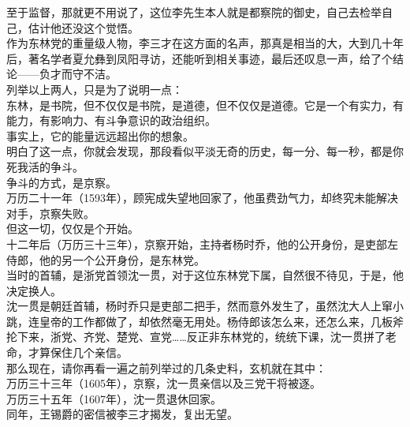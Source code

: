 \begin{multicols}{\theparacolNo}
至于监督，那就更不用说了，这位李先生本人就是都察院的御史，自己去检举自己，估计他还没这个觉悟。\\

作为东林党的重量级人物，李三才在这方面的名声，那真是相当的大，大到几十年后，著名学者夏允彝到凤阳寻访，还能听到相关事迹，最后还叹息一声，给了个结论——负才而守不洁。\\

列举以上两人，只是为了说明一点：\\

东林，是书院，但不仅仅是书院，是道德，但不仅仅是道德。它是一个有实力，有能力，有影响力、有斗争意识的政治组织。\\

事实上，它的能量远远超出你的想象。\\

明白了这一点，你就会发现，那段看似平淡无奇的历史，每一分、每一秒，都是你死我活的争斗。\\

争斗的方式，是京察。\\

万历二十一年（1593年），顾宪成失望地回家了，他虽费劲气力，却终究未能解决对手，京察失败。\\

但这一切，仅仅是个开始。\\

十二年后（万历三十三年），京察开始，主持者杨时乔，他的公开身份，是吏部左侍郎，他的另一个公开身份，是东林党。\\

当时的首辅，是浙党首领沈一贯，对于这位东林党下属，自然很不待见，于是，他决定换人。\\

沈一贯是朝廷首辅，杨时乔只是吏部二把手，然而意外发生了，虽然沈大人上窜小跳，连皇帝的工作都做了，却依然毫无用处。杨侍郎该怎么来，还怎么来，几板斧抡下来，浙党、齐党、楚党、宣党……反正非东林党的，统统下课，沈一贯拼了老命，才算保住几个亲信。\\

那么现在，请你再看一遍之前列举过的几条史料，玄机就在其中：\\

万历三十三年（1605年），京察，沈一贯亲信以及三党干将被逐。\\

万历三十五年（1607年），沈一贯退休回家。\\

同年，王锡爵的密信被李三才揭发，复出无望。\\


\end{multicols}
